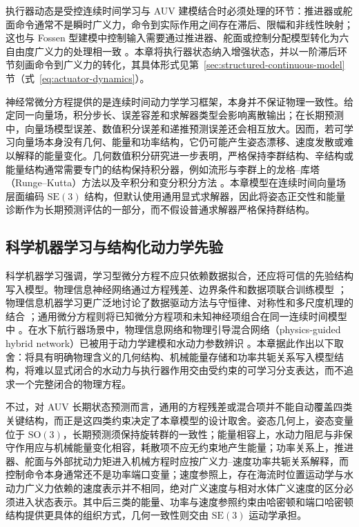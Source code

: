 \documentclass[UTF8,zihao=-4]{ctexrep}
\newcommand{\SO}{\mathrm{SO}}
\newcommand{\SE}{\mathrm{SE}}
\begin{document}
执行器动态是受控连续时间学习与 AUV 建模结合时必须处理的环节：推进器或舵面命令通常不是瞬时广义力，命令到实际作用之间存在滞后、限幅和非线性映射；这也与 Fossen 型建模中控制输入需要通过推进器、舵面或控制分配模型转化为六自由度广义力的处理相一致 \citep{fossen2011handbook}。本章将执行器状态纳入增强状态，并以一阶滞后环节刻画命令到广义力的转化，其具体形式见第~\ref{sec:structured-continuous-model} 节（式~\eqref{eq:actuator-dynamics}）。

神经常微分方程提供的是连续时间动力学学习框架，本身并不保证物理一致性。给定同一向量场，积分步长、误差容差和求解器类型会影响离散输出；在长期预测中，向量场模型误差、数值积分误差和递推预测误差还会相互放大。因而，若可学习向量场本身没有几何、能量和功率结构，它仍可能产生姿态漂移、速度发散或难以解释的能量变化。几何数值积分研究进一步表明，严格保持李群结构、辛结构或能量结构通常需要专门的结构保持积分器，例如流形与李群上的龙格--库塔（Runge--Kutta）方法以及辛积分和变分积分方法 \citep{munthekaas1999liegrouprk,iserles2000liegroupmethods,hairer2006geometric}。本章模型在连续时间向量场层面编码 \(\SE(3)\) 结构，但默认使用通用显式求解器，因此将姿态正交性和能量诊断作为长期预测评估的一部分，而不假设普通求解器严格保持群结构。

\subsection{科学机器学习与结构化动力学先验}

科学机器学习强调，学习型微分方程不应只依赖数据拟合，还应将可信的先验结构写入模型。物理信息神经网络通过方程残差、边界条件和数据项联合训练模型 \citep{raissi2019pinn}；物理信息机器学习更广泛地讨论了数据驱动方法与守恒律、对称性和多尺度机理的结合 \citep{karniadakis2021piml}；通用微分方程则将已知微分方程项和未知神经项组合在同一连续时间模型中 \citep{rackauckas2020ude}。在水下航行器场景中，物理信息网络和物理引导混合网络（physics-guided hybrid network）已被用于动力学建模和水动力参数辨识 \citep{zhao2024auvpin,fei2026pghynet}。本章据此作出以下取舍：将具有明确物理含义的几何结构、机械能量存储和功率共轭关系写入模型结构，将难以显式闭合的水动力与执行器作用交由受约束的可学习分支表达，而不追求一个完整闭合的物理方程。

不过，对 AUV 长期状态预测而言，通用的方程残差或混合项并不能自动覆盖四类关键结构，而正是这四类约束决定了本章模型的设计取舍。姿态几何上，姿态变量位于 \(\SO(3)\)，长期预测须保持旋转群的一致性；能量相容上，水动力阻尼与非保守作用应与机械能量变化相容，耗散项不应无约束地产生能量；功率关系上，推进器、舵面与外部扰动力矩进入机械方程时应按广义力--速度功率共轭关系解释，而控制命令本身通常还不是功率端口变量；速度参照上，存在海流时位置运动学与水动力广义力依赖的速度表示并不相同，绝对广义速度与相对水体广义速度的区分必须进入状态表示。其中后三类的能量、功率与速度参照约束由哈密顿和端口哈密顿结构提供更具体的组织方式，几何一致性则交由 \(\SE(3)\) 运动学承担。
\end{document}
